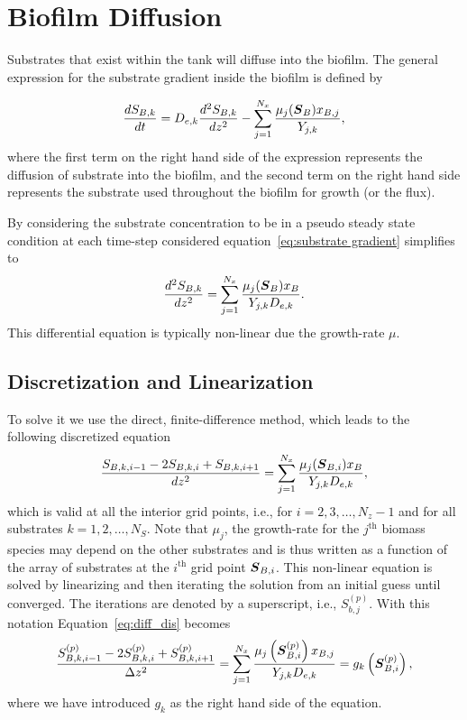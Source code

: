 \documentclass[letterpaper, twoside]{article}
\numberwithin{equation}{section}
\newcommand{\ie}{i.e.}
\def\bm#1{\mbox{\boldmath{$#1$}}}
\begin{document}
\section{Biofilm Diffusion}
Substrates that exist within the tank will diffuse into the biofilm. The general expression for the substrate gradient inside the biofilm is defined by

\begin{equation} \label{eq:substrate gradient}
\frac{dS_{B,k}}{dt} = D_{e,k} \frac{d^2S_{B,k}}{dz^2} - \sum_{j=1}^{N_x}\frac{\mu_j(\bm{S}_B) x_{B,j}}{Y_{j,k}},
\end{equation}
where the first term on the right hand side of the expression represents the diffusion of substrate into the biofilm, and the second term on the right hand side represents the substrate used throughout the biofilm for growth (or the flux).

By considering the substrate concentration to be in a pseudo steady state condition at each time-step considered equation~\ref {eq:substrate gradient} simplifies to 
\begin{equation} \label{eq:diffusion}
  \frac{d^2 S_{B,k}}{dz^2} = \sum_{j=1}^{N_x}\frac{\mu_j(\bm{S}_B) x_B}{Y_{j,k} D_{e,k}}.
\end{equation}
This differential equation is typically non-linear due the growth-rate $\mu$.

\subsection{Discretization and Linearization}
To solve it we use the direct, finite-difference method, which leads to the following discretized equation
\begin{equation} \label{eq:diff_dis}
  \frac{ S_{B,k,i-1} - 2 S_{B,k,i} + S_{B,k,i+1}}{dz^2} = \sum_{j=1}^{N_x}\frac{\mu_j(\bm{S}_{B,i}) x_B}{Y_{j,k} D_{e,k}},
\end{equation}
which is valid at all the interior grid points, \ie, for $i=2,3,\dots,N_z-1$ and for all substrates $k=1,2,\dots,N_S$.
Note that $\mu_j$, the growth-rate for the $j^\mathrm{th}$ biomass species may depend on the other substrates and is thus written as a function of the array of substrates at the $i^\mathrm{th}$ grid point $\bm{S}_{B,i}$.
This non-linear equation is solved by linearizing and then iterating the solution from an initial guess until converged.
The iterations are denoted by a superscript, \ie, $S_{b,j}^{(p)}$.  With this notation Equation~\ref{eq:diff_dis} becomes
\begin{equation} \label{eq:diff_dis_iter}
  \frac{ S_{B,k,i-1}^{(p)} - 2 S_{B,k,i}^{(p)} + S_{B,k,i+1}^{(p)}}{\Delta z^2} = \sum_{j=1}^{N_x} \frac{\mu_j\left(\bm{S}_{B,i}^{(p)}\right) x_{B,j}}{Y_{j,k} D_{e,k}} =  g_k\left(\bm{S}_{B,i}^{(p)}\right),
\end{equation}
where we have introduced $g_k$ as the right hand side of the equation.
\end{document}
